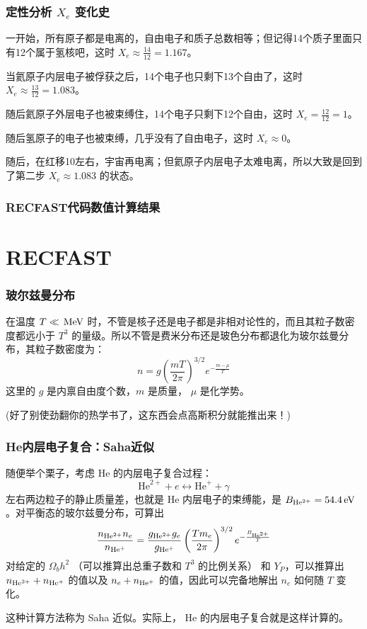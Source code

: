 \documentclass[CJK,13pt]{beamer}
\begin{document}
  \begin{frame}
    \frametitle{定性分析 $X_e$ 变化史}
    \bitem
  \item{一开始，所有原子都是电离的，自由电子和质子总数相等；但记得14个质子里面只有12个属于氢核吧，这时 $X_e\approx \frac{14}{12}=1.167$。}
  \item{当氦原子内层电子被俘获之后，14个电子也只剩下13个自由了，这时 $X_e\approx \frac{13}{12} = 1.083$。}
  \item{随后氦原子外层电子也被束缚住，14个电子只剩下12个自由，这时 $X_e = \frac{12}{12}=1$。}
  \item{随后氢原子的电子也被束缚，几乎没有了自由电子，这时  $X_e \approx 0$。}
  \item{随后，在红移10左右，宇宙再电离；但氦原子内层电子太难电离，所以大致是回到了第二步 $X_e\approx 1.083$ 的状态。}
    \eitem
  \end{frame}


  \begin{frame}
    \frametitle{RECFAST代码数值计算结果}
  \end{frame}

  \section{RECFAST}


  \begin{frame}
    \frametitle{玻尔兹曼分布}
    在温度 $T \ll \,\mathrm{MeV}$ 时，不管是核子还是电子都是非相对论性的，而且其粒子数密度都远小于 $T^3$ 的量级。所以不管是费米分布还是玻色分布都退化为玻尔兹曼分布，其粒子数密度为：
    $$ n = g \left(\frac{mT}{2\pi}\right)^{3/2} e^{-\frac{m-\mu}{T}}$$
    这里的 $g$ 是内禀自由度个数，$m$ 是质量， $\mu$ 是化学势。
    
    (好了别使劲翻你的热学书了，这东西会点高斯积分就能推出来！)
  \end{frame}


  \begin{frame}
    \frametitle{He内层电子复合：Saha近似}
    随便举个栗子，考虑 $\mathrm{He}$ 的内层电子复合过程：
    $$\mathrm{He}^{2+}+e \leftrightarrow \mathrm{He}^+ + \gamma$$
    左右两边粒子的静止质量差，也就是 $\mathrm{He}$ 内层电子的束缚能，是 $B_{\rm He^{2+}}=54.4\,\mathrm{eV}$。对平衡态的玻尔兹曼分布，可算出
    $$\frac{n_{\rm He^{2+}} n_e}{n_{\rm He^{+}}} = \frac{g_{\rm He^{2+}} g_e}{g_{\rm He^{+}}}\left(\frac{Tm_e}{2\pi}\right)^{3/2}e^{-\frac{B_{\rm He^{2+}}}{T}} $$
    对给定的 $\Omega_bh^2$ （可以推算出总重子数和 $T^3$ 的比例关系） 和 $Y_P$，可以推算出 $ n_{\rm He^{2+}} + n_{\rm He^{+}} $ 的值以及 $n_e+n_{\rm He^{+}}$ 的值，因此可以完备地解出 $n_e$ 如何随 $T$ 变化。

    这种计算方法称为 Saha 近似。实际上， $\mathrm{He}$ 的内层电子复合就是这样计算的。
  \end{frame}
  
\end{document}
